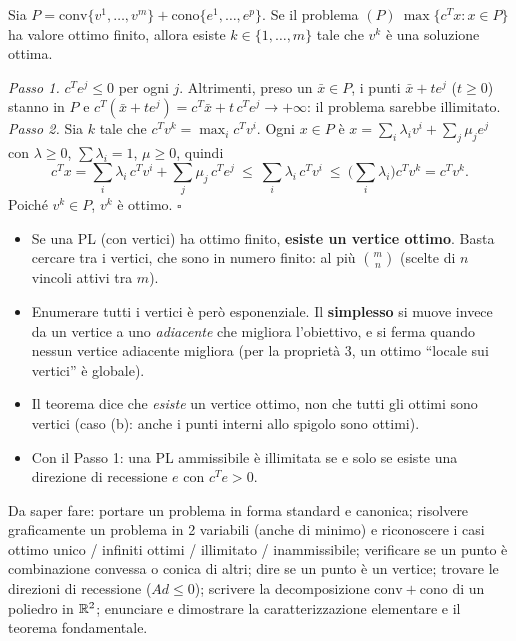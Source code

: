\begin{prop}
Sia $P=\mathrm{conv}\{v^1,\dots,v^m\}+\mathrm{cono}\{e^1,\dots,e^p\}$. Se il problema $(P)\ \max\{c^Tx: x\in P\}$ ha valore ottimo finito, allora esiste $k\in\{1,\dots,m\}$ tale che $v^k$ è una soluzione ottima.
\end{prop}
\begin{dimo}
\emph{Passo 1.} $c^Te^j\le0$ per ogni $j$. Altrimenti, preso un $\bar x\in P$, i punti $\bar x+te^j$ ($t\ge0$) stanno in $P$ e $c^T(\bar x+te^j)=c^T\bar x+t\,c^Te^j\to+\infty$: il problema sarebbe illimitato.
\emph{Passo 2.} Sia $k$ tale che $c^Tv^k=\max_ic^Tv^i$. Ogni $x\in P$ è $x=\sum_i\lambda_iv^i+\sum_j\mu_je^j$ con $\lambda\ge0$, $\sum\lambda_i=1$, $\mu\ge0$, quindi
\[ c^Tx=\sum_i\lambda_i\,c^Tv^i+\sum_j\mu_j\,c^Te^j\ \le\ \sum_i\lambda_i\,c^Tv^i\ \le\ \Big(\sum_i\lambda_i\Big)c^Tv^k=c^Tv^k. \]
Poiché $v^k\in P$, $v^k$ è ottimo. \hfill$\square$
\end{dimo}

\begin{oss}[conseguenze]
\begin{itemize}[nosep]
\item Se una PL (con vertici) ha ottimo finito, \textbf{esiste un vertice ottimo}. Basta cercare tra i vertici, che sono in numero finito: al più $\binom{m}{n}$ (scelte di $n$ vincoli attivi tra $m$).
\item Enumerare tutti i vertici è però esponenziale. Il \textbf{simplesso} si muove invece da un vertice a uno \emph{adiacente} che migliora l'obiettivo, e si ferma quando nessun vertice adiacente migliora (per la proprietà 3, un ottimo ``locale sui vertici'' è globale).
\item Il teorema dice che \emph{esiste} un vertice ottimo, non che tutti gli ottimi sono vertici (caso (b): anche i punti interni allo spigolo sono ottimi).
\item Con il Passo 1: una PL ammissibile è illimitata se e solo se esiste una direzione di recessione $e$ con $c^Te>0$.
\end{itemize}
\end{oss}

\begin{esame}
Da saper fare: portare un problema in forma standard e canonica; risolvere graficamente un problema in 2 variabili (anche di minimo) e riconoscere i casi ottimo unico / infiniti ottimi / illimitato / inammissibile; verificare se un punto è combinazione convessa o conica di altri; dire se un punto è un vertice; trovare le direzioni di recessione ($Ad\le0$); scrivere la decomposizione $\mathrm{conv}+\mathrm{cono}$ di un poliedro in $\mathbb{R}^2$; enunciare e dimostrare la caratterizzazione elementare e il teorema fondamentale.
\end{esame}
